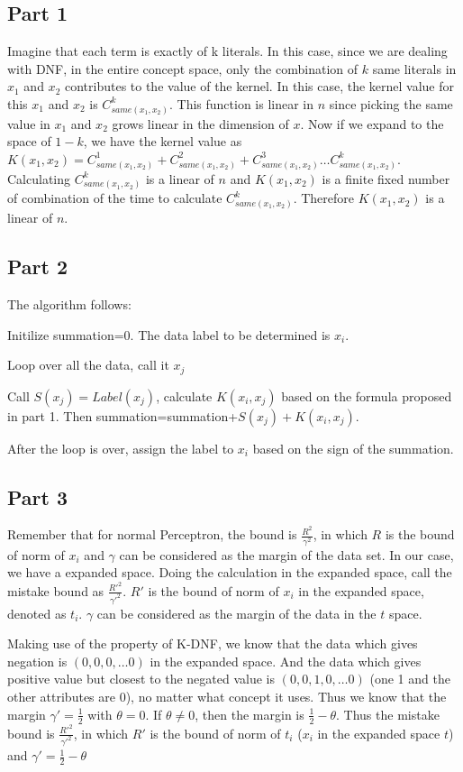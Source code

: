 \subsection{Part 1}
Imagine that each term is exactly of k literals. In this case, since we are dealing with DNF, in the entire concept space, only the combination of $k$ same literals in $x_1$ and $x_2$ contributes to the value of the kernel. In this case, the kernel value for this  $x_1$ and $x_2$ is $C_{same(x_1,x_2)}^k$. This function is linear in $n$ since picking the same value in $x_1$ and $x_2$ grows linear in the dimension of $x$. Now if we expand to the space of $1-k$, we have the kernel value as $K(x_1,x_2)=C_{same(x_1,x_2)}^1 + C_{same(x_1,x_2)}^2 + C_{same(x_1,x_2)}^3\ldots C_{same(x_1,x_2)}^k$. Calculating $C_{same(x_1,x_2)}^k$ is a linear of $n$ and $K(x_1,x_2)$ is a finite fixed number of combination of the time to calculate $C_{same(x_1,x_2)}^k$. Therefore $K(x_1,x_2)$ is a linear of $n$. 

\subsection{Part 2}
The algorithm follows:

\noindent Initilize summation=0. The data label to be determined is $x_i$. 

\noindent Loop over all the data, call it $x_j$

\indent \indent Call $S(x_j)=Label(x_j)$, calculate $K(x_i,x_j)$ based on the formula proposed in part 1. \indent \indent Then summation=summation+$S(x_j)+K(x_i,x_j)$. 

\noindent After the loop is over, assign the label to $x_i$ based on the sign of the summation.

\subsection{Part 3}
Remember that for normal Perceptron, the bound is $\frac{R^2}{\gamma^2}$, in which $R$ is the bound of norm of $x_i$ and $\gamma$ can be considered as the margin of the data set. In our case, we have a expanded space. Doing the calculation in the expanded space, call the mistake bound as $\frac{R'^2}{\gamma'^2}$. $R'$ is the bound of norm of $x_i$ in the expanded space, denoted as $t_i$. $\gamma$ can be considered as the margin of the data in the $t$ space. 

Making use of the property of K-DNF, we know that the data which gives negation is $(0,0,0,\ldots 0)$ in the expanded space. And the data which gives positive value but closest to the negated value is $(0,0,1,0,\ldots 0)$ (one 1 and the other attributes are 0), no matter what concept it uses. Thus we know that the margin $\gamma'=\frac{1}{2}$ with $\theta=0$. If $\theta\neq0$, then the margin is $\frac{1}{2}-\theta$. Thus the mistake bound is $\frac{R'^2}{\gamma'^2}$, in which $R'$ is the bound of norm of $t_i$ ($x_i$ in the expanded space $t$) and $\gamma'=\frac{1}{2}-\theta$



